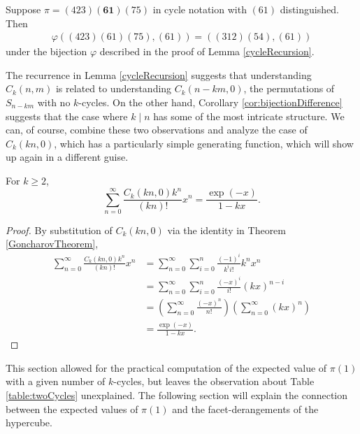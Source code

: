 \begin{example}
  Suppose $\pi = (423)\mathbf{(61)}(75)$ in cycle notation with $(61)$ distinguished.
  Then \begin{align}
    \varphi((423)(61)(75), (61)) = ((312)(54), (61))
  \end{align} under the bijection $\varphi$ described in the proof of
  Lemma \ref{cycleRecursion}.
\end{example}
The recurrence in Lemma \ref{cycleRecursion} suggests that understanding
$C_k(n,m)$ is related to understanding $C_k(n-km, 0)$,
the permutations of $S_{n-km}$ with no $k$-cycles.
On the other hand,
Corollary \ref{cor:bijectionDifference} suggests that the case where $k \mid n$
has some of the most intricate structure.
We can, of course, combine these two observations and analyze the case of
$C_k(kn, 0)$, which has a particularly simple generating function, which will
show up again in a different guise.
\begin{lemma}
  For $k \geq 2$,
  \label{cycleEGF}
  \begin{equation}
    \sum_{n=0}^\infty \frac{C_k(kn, 0)k^n}{(kn)!}x^n
    = \frac{\exp(-x)}{1-kx}.
  \end{equation}
\end{lemma}
\begin{proof}
  By substitution of $C_k(kn, 0)$ via the identity in Theorem \ref{GoncharovTheorem},
  \begin{align}
    \sum_{n=0}^\infty \frac{C_k(kn, 0)k^n}{(kn)!}x^n
    &= \sum_{n=0}^\infty \sum_{i=0}^n \frac{(-1)^i}{k^i i!}k^nx^n \\
    &= \sum_{n=0}^\infty \sum_{i=0}^n \frac{(-x)^i}{i!}(kx)^{n-i} \\
    &= \left(\sum_{n=0}^\infty \frac{(-x)^n}{n!}\right) \left(\sum_{n=0}^\infty (kx)^n\right) \\
    &= \frac{\exp(-x)}{1-kx}.
  \end{align}
\end{proof}

This section allowed for the practical computation of the expected value of
$\pi(1)$ with a given number of $k$-cycles, but leaves the observation about
Table \ref{table:twoCycles} unexplained. The following section will
explain the connection between the expected values of $\pi(1)$ and the
facet-derangements of the hypercube.


